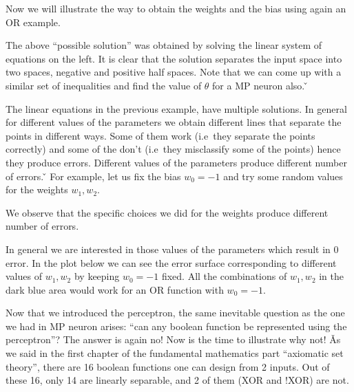\be
Now we will illustrate the way to obtain the weights and the bias using again an OR example.


\vspace{-5pt}

The above ``possible solution'' was obtained by solving the linear system of equations on the left. It is clear that
the solution separates the input space into two spaces, negative and positive half spaces. Note that we can come up
with a similar set of inequalities and find the value of $\theta$ for a MP neuron also. \v
\ee

The linear equations in the previous example, have multiple solutions. In general for different values of the
parameters we obtain different lines that separate the points in different ways. Some of them work (i.e\ they
separate the points correctly) and some of the don't (i.e\ they misclassify some of the points) hence they produce
errors. Different values of the parameters produce different number of errors. \v

\be
For example, let us fix the bias $w_0 = -1$ and try some random values for the weights $w_1, w_2$.


We observe that the specific choices we did for the weights produce different number of errors.


\vspace{-5pt}

In general we are interested in those values of the parameters which result in 0 error. In the plot below we can see
the error surface corresponding to different values of $w_1, w_2$ by keeping $w_0 = -1$ fixed. All the combinations
of $w_1, w_2$ in the dark blue area would work for an OR function with $w_0 = -1$.


\ee

Now that we introduced the perceptron, the same inevitable question as the one we had in MP neuron arises: ``can any
boolean function be represented using the perceptron''? The answer is again no! Now is the time to illustrate why
not! \v

As we said in the first chapter of the fundamental mathematics part ``axiomatic set theory'', there are 16 boolean
functions one can design from 2 inputs. Out of these 16, only 14 are linearly separable, and 2 of them (XOR and !XOR)
are not.

